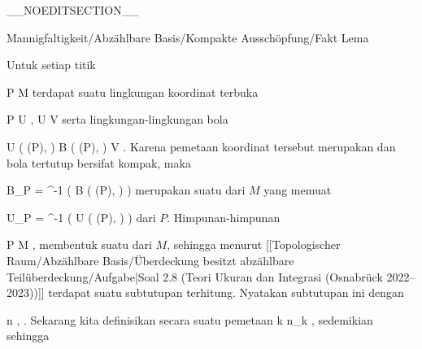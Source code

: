 
__NOEDITSECTION__

{Mannigfaltigkeit/Abzählbare Basis/Kompakte Ausschöpfung/Fakt}
{Lema}
{}
{

\faktzusatz {}
\faktzusatz {}

}
{

Untuk setiap titik

\mavergleichskette
{\vergleichskette
{ P
}
{ \in }{ M
}
{  }{
}
{    }{
}
{   }{
}
}
{}{}{}
terdapat suatu lingkungan koordinat terbuka

\mavergleichskette
{\vergleichskette
{ P
}
{ \in }{ U
}
{  }{
}
{    }{
}
{   }{
}
}
{}{}{,}
\maabbdisp {\alpha} { U } { V
} {}
serta lingkungan-lingkungan bola

\mavergleichskettedisp
{\vergleichskette
{ U \left(  \alpha(P), \epsilon  \right)
}
{ \subseteq} { B  \left( \alpha(P), \epsilon \right)
}
{ \subset} { V
}
{ } {
}
{ } {
}
}
{}{}{.}
Karena pemetaan koordinat tersebut merupakan
dan bola tertutup bersifat kompak, maka

\mavergleichskette
{\vergleichskette
{ B_P
}
{ = }{ \alpha^{-1} \left(  B  \left( \alpha(P), \epsilon \right)  \right)
}
{  }{
}
{    }{
}
{   }{
}
}
{}{}{}
merupakan suatu
dari $M$ yang memuat

\mavergleichskette
{\vergleichskette
{ U_P
}
{ = }{ \alpha^{-1} \left(  U \left(  \alpha(P), \epsilon  \right)  \right)
}
{  }{
}
{    }{
}
{   }{
}
}
{}{}{}
dari $P$. Himpunan-himpunan

 {}
 {P \in M} {}
 {} {} {} {,}
membentuk suatu
dari $M$, sehingga menurut
[[Topologischer Raum/Abzählbare Basis/Überdeckung besitzt abzählbare Teilüberdeckung/Aufgabe|Soal 2.8 (Teori Ukuran dan Integrasi (Osnabrück 2022--2023))]]
terdapat suatu subtutupan terhitung. Nyatakan subtutupan ini dengan

 {}
 {n \in \N} {}
 {} {} {} {,}
 {} {.}
Sekarang kita definisikan secara
suatu pemetaan
\maabbeledisp {} {\N} {\N
} { k } {n_k
} {,}
sedemikian sehingga

}
